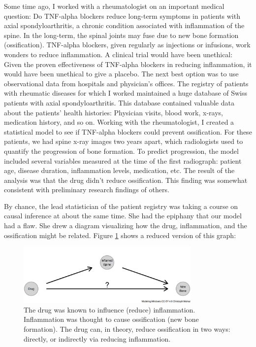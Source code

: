 \documentclass[
  10pt,
]{scrbook}
\begin{document}
Some time ago, I worked with a rheumatologist on an important medical question:
Do TNF-alpha blockers reduce long-term symptoms in patients with axial spondyloarthritis, a chronic condition associated with inflammation of the spine.
In the long-term, the spinal joints may fuse due to new bone formation (ossification).
TNF-alpha blockers, given regularly as injections or infusions, work wonders to reduce inflammation.
A clinical trial would have been unethical:
Given the proven effectiveness of TNF-alpha blockers in reducing inflammation, it would have been unethical to give a placebo.
The next best option was to use observational data from hospitals and physician's offices.
The registry of patients with rheumatic diseases for which I worked maintained a huge database of Swiss patients with axial spondyloarthritis.
This database contained valuable data about the patients' health histories:
Physician visits, blood work, x-rays, medication history, and so on.
Working with the rheumatologist, I created a statistical model to see if TNF-alpha blockers could prevent ossification.
For these patients, we had spine x-ray images two years apart, which radiologists used to quantify the progression of bone formation.
To predict progression, the model included several variables measured at the time of the first radiograph: patient age, disease duration, inflammation levels, medication, etc.
The result of the analysis was that the drug didn't reduce ossification.
This finding was somewhat consistent with preliminary research findings of others.

By chance, the lead statistician of the patient registry was taking a course on causal inference at about the same time.
She had the epiphany that our model had a flaw.
She drew a diagram visualizing how the drug, inflammation, and the ossification might be related.
Figure \ref{fig:tnfdag} shows a reduced version of this graph:

\begin{figure}

{\centering \includegraphics[width=0.8\textwidth]{figures/tnfdag-1} 

}

\caption{The drug was known to influence (reduce) inflammation. Inflammation was thought to cause ossification (new bone formation). The drug can, in theory, reduce ossification in two ways: directly, or indirectly via reducing inflammation.}\label{fig:tnfdag}
\end{figure}
\end{document}
